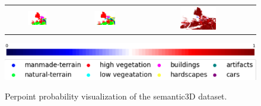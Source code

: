 \begin{figure}[h!]
\begin{tabular}{ccc}
            \includegraphics[width=0.33\textwidth, height=0.18\textheight]{images/seg_output/sem3d_seg_output/3_GT.png} &
            \includegraphics[width=0.33\textwidth, height=0.18\textheight]{images/seg_output/sem3d_seg_output/3_Pred.png}& 
            \includegraphics[width=0.33\textwidth, height=0.18\textheight]{images/seg_output/sem3d_seg_output/3_max_prob.png}\\
        \end{tabular}
        \includegraphics[scale=0.213]{images/color_legend.pdf}
        \includegraphics[scale=0.65]{images/legend.png}
        \caption{Perpoint probability visualization of the semantic3D dataset.}
    \end{figure}

